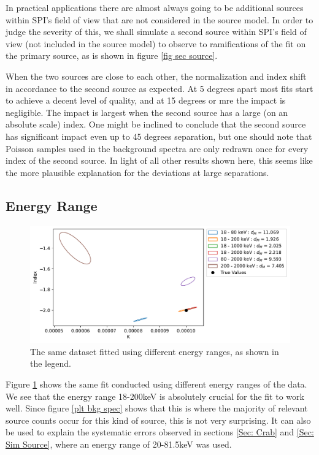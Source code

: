 \documentclass{article}
\begin{document}
In practical applications there are almost always going to be additional sources within SPI's field of view that are not considered in the source model. In order to judge the severity of this, we shall simulate a second source within SPI's field of view (not included in the source model) to observe to ramifications of the fit on the primary source, as is shown in figure \ref{fig sec source}. 

When the two sources are close to each other, the normalization and index shift in accordance to the second source as expected. At 5 degrees apart most fits start to achieve a decent level of quality, and at 15 degrees or mre the impact is negligible. The impact is largest when the second source has a large (on an absolute scale) index. One might be inclined to conclude that the second source has significant impact even up to 45 degrees separation, but one should note that Poisson samples used in the background spectra are only redrawn once for every index of the second source. In light of all other results shown here, this seems like the more plausible explanation for the deviations at large separations. 

\FloatBarrier

\subsection{Energy Range}

\begin{figure}[h]
    \centering
    \includegraphics[width=\textwidth]{Images/energy_ranges.pdf}
    \caption{The same dataset fitted using different energy ranges, as shown in the legend.}
    \label{fig energy range}
\end{figure}

Figure \ref{fig energy range} shows the same fit conducted using different energy ranges of the data. We see that the energy range 18-200keV is absolutely crucial for the fit to work well. Since figure \ref{plt bkg spec} shows that this is where the majority of relevant source counts occur for this kind of source, this is not very surprising. It can also be used to explain the systematic errors observed in sections \ref{Sec: Crab} and \ref{Sec: Sim Source}, where an energy range of 20-81.5keV was used.
\end{document}
